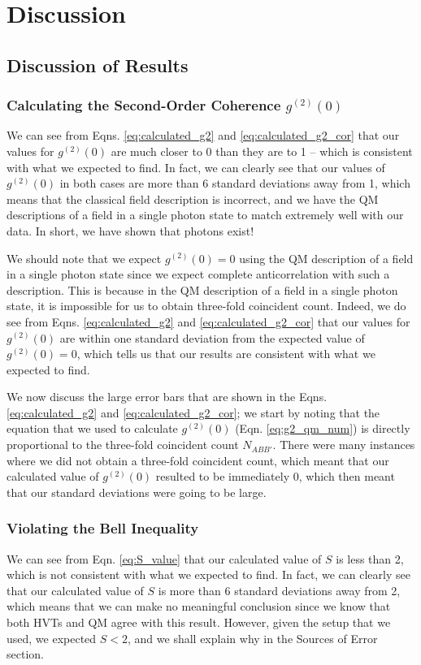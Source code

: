 \documentclass[twocolumn,amsmath,amssymb,pra]{revtex4-2}
\begin{document}
\section{Discussion}

\subsection{Discussion of Results}

\subsubsection{Calculating the Second-Order Coherence $g^{(2)}(0)$}
We can see from Eqns. \ref{eq:calculated_g2} and \ref{eq:calculated_g2_cor} that our values for $g^{(2)}(0)$ are much closer to 0 than they are to 1 -- which is consistent with what we expected to find. In fact, we can clearly see that our values of $g^{(2)}(0)$ in both cases are more than 6 standard deviations away from 1, which means that the classical field description is incorrect, and we have the QM descriptions of a field in a single photon state to match extremely well with our data. In short, we have shown that photons exist! 

We should note that we expect $g^{(2)}(0) = 0$ using the QM description of a field in a single photon state since we expect complete anticorrelation with such a description. This is because in the QM description of a field in a single photon state, it is impossible for us to obtain three-fold coincident count. Indeed, we do see from Eqns. \ref{eq:calculated_g2} and \ref{eq:calculated_g2_cor} that our values for $g^{(2)}(0)$ are within one standard deviation from the expected value of $g^{(2)}(0) = 0$, which tells us that our results are consistent with what we expected to find.

We now discuss the large error bars that are shown in the Eqns. \ref{eq:calculated_g2} and \ref{eq:calculated_g2_cor}; we start by noting that the equation that we used to calculate $g^{(2)}(0)$ (Eqn. \ref{eq:g2_qm_num}) is directly proportional to the three-fold coincident count $N_{ABB'}$. There were many instances where we did not obtain a three-fold coincident count, which meant that our calculated value of $g^{(2)}(0)$ resulted to be immediately 0, which then meant that our standard deviations were going to be large. 

\subsubsection{Violating the Bell Inequality}
We can see from Eqn. \ref{eq:S_value} that our calculated value of $S$ is less than 2, which is not consistent with what we expected to find. In fact, we can clearly see that our calculated value of $S$ is more than 6 standard deviations away from 2, which means that we can make no meaningful conclusion since we know that both HVTs and QM agree with this result. However, given the setup that we used, we expected $S < 2$, and we shall explain why in the Sources of Error section.
\end{document}
